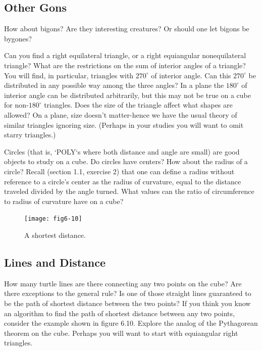 \documentclass{book}
\begin{document}
\subsection{Other Gons}

How about bigons? Are they interesting creatures? Or should one let
bigons be bygones?

Can you find a right equilateral triangle, or a right equiangular nonequilateral triangle? What are the restrictions on the sum of interior
angles of a triangle? You will find, in particular, triangles with $270^{\circ}$ of
interior angle. Can this $270^{\circ}$ be distributed in any possible way among
the three angles? In a plane the $180^{\circ}$ of interior angle can be distributed
arbitrarily, but this may not be true on a cube for non-$180^{\circ}$ triangles.
Does the size of the triangle affect what shapes are allowed? On a plane,
size doesn't matter-hence we have the usual theory of similar triangles
ignoring size. (Perhaps in your studies you will want to omit starry
triangles.)

Circles (that is, \textsc{`POLY`}s where both distance and angle are small) are
good objects to study on a cube. Do circles have centers? How about
the radius of a circle? Recall (section 1.1, exercise 2) that one can define
a radius without reference to a circle's center as the radius of curvature,
equal to the distance traveled divided by the angle turned. What values
can the ratio of circumference to radius of curvature have on a cube?

\begin{figure}
\begin{center}
\texttt{[image: fig6-10]}
\caption{A shortest distance.}
\end{center}
\end{figure}

\subsection{Lines and Distance}

How many turtle lines are there connecting any two points on the cube?
Are there exceptions to the general rule? Is one of those straight lines
guaranteed to be the path of shortest distance between the two points?
If you think you know an algorithm to find the path of shortest distance
between any two points, consider the example shown in figure 6.10.
Explore the analog of the Pythagorean theorem on the cube. Perhaps
you will want to start with equiangular right triangles.
\end{document}
